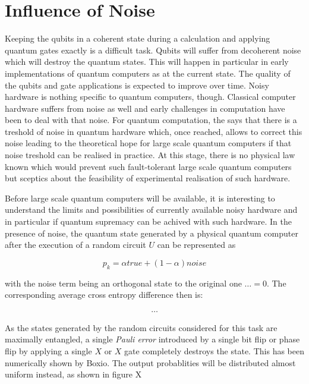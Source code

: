 \section{Influence of Noise}

Keeping the qubits in a coherent state during a calculation and applying quantum
gates exactly is a difficult task. Qubits will suffer from decoherent noise
which will destroy the quantum states. This will happen in particular in early
implementations of quantum computers as at the current state. The quality of the
qubits and gate applications is expected to improve over time. Noisy hardware is
nothing specific to quantum computers, though. Classical computer hardware
suffers from noise as well and early challenges in computation have been to deal
with that noise. For quantum computation, the  says that there is a treshold of noise in quantum hardware which,
once reached, allows to correct this noise leading to the theoretical hope for
large scale quantum computers if that noise treshold can be realised in
practice. At this stage, there is no physical law known which would prevent such
fault-tolerant large scale quantum computers but sceptics about the feasibility
of experimental realisation of such hardware.

Before large scale quantum computers will be available, it is interesting to
understand the limits and possibilities of currently available noisy hardware
and in particular if quantum supremacy can be achived with such hardware. In the
presence of noise, the quantum state generated by a physical quantum computer
after the execution of a random circuit $U$ can be represented as

\begin{equation}
  p_k = \alpha true + (1-\alpha) noise
\end{equation}

with the noise term being an orthogonal state to the original one $\dots = 0$.
The corresponding average cross entropy difference then is:

\begin{align}
  \dots
\end{align}

As the states generated by the random circuits considered for this task are
maximally entangled, a single \textit{Pauli error} introduced by a single bit
flip or phase flip by applying a single $X$ or $X$ gate completely destroys the
state. This has been numerically shown by Boxio. The output probablities will be
distributed almost uniform instead, as shown in figure X

